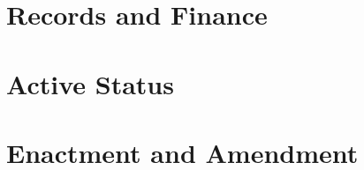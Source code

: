 \documentclass[bylaws,final,10pt,withoutoptional,withoutpreface]{../bylaws}
\begin{document}
\chapter{Records and Finance}\label{sec:records}



\chapter{Active Status}\label{sec:activeStatus}



\chapter{Enactment and Amendment}\label{sec:amendment}



\appendix


%




\end{document}
